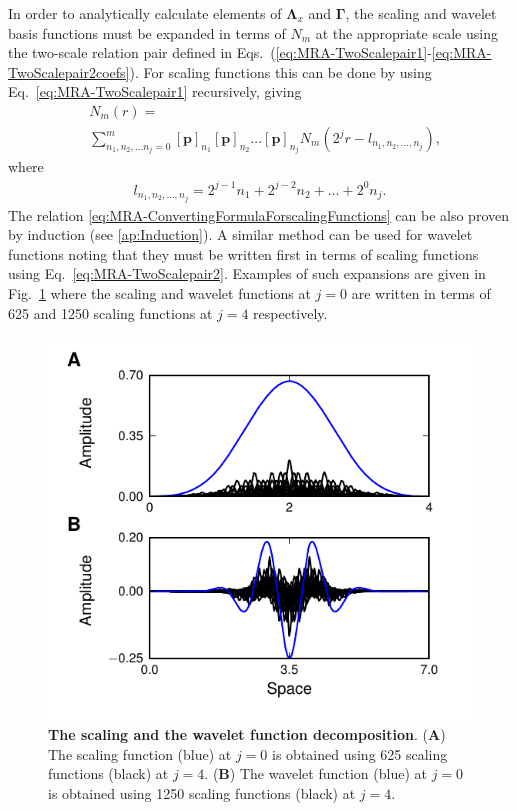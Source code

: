 \documentclass[review,authoryear,3p]{elsarticle}
\begin{document}
In order to analytically calculate elements of $\boldsymbol\Lambda_{x}$ and $\boldsymbol\Gamma$, the scaling and wavelet basis functions must be expanded in terms of $N_m$ at the appropriate scale using the two-scale relation pair defined in Eqs.~(\eqref{eq:MRA-TwoScalepair1}-\eqref{eq:MRA-TwoScalepair2coefs}). For scaling functions this can be done  by using Eq.~\eqref{eq:MRA-TwoScalepair1} recursively, giving
\begin{align}\label{eq:MRA-ConvertingFormulaForscalingFunctions}
 &N_m(r)=\nonumber \\
&\sum_{n_1,n_2, \dots n_j=0}^{m}\left[\mathbf p\right]_{n_1} \left[\mathbf p\right]_{n_2}\dots \left[\mathbf p\right]_{n_j}N_m(2^jr-l_{n_1,n_2, \dots, n_j}),
\end{align}
where 
\begin{align}
 l_{n_1,n_2, \dots, n_j}=2^{j-1}n_1+2^{j-2}n_2+ \dots +2^{0}n_j.
\end{align}
The relation \eqref{eq:MRA-ConvertingFormulaForscalingFunctions} can be also proven by induction (see \ref{ap:Induction}). A similar method can be used for wavelet functions noting that they must be written first in terms of scaling functions using Eq.~\eqref{eq:MRA-TwoScalepair2}. Examples of such expansions are given in Fig.~\ref{fig:MRA-BasisDecomposition} where the scaling and wavelet functions at $j=0$ are written in terms of 625 and 1250 scaling functions at $j=4$ respectively.
\begin{figure}[!t] 
 	\centering
 		\includegraphics[scale=1]{./Graph/fig5.pdf}
 		\caption{{\bf The scaling and the wavelet function decomposition}. (\textbf{A}) The scaling function (blue) at $j=0$ is obtained using 625 scaling functions (black) at $j=4$. (\textbf{B}) The wavelet function (blue) at $j=0$ is obtained using 1250 scaling functions (black) at $j=4$.}
 	\label{fig:MRA-BasisDecomposition}
 \end{figure}  
\end{document}
